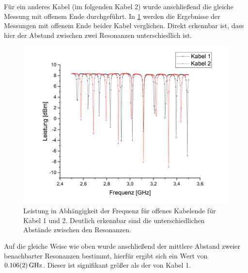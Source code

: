 Für ein anderes Kabel (im folgenden Kabel 2) wurde anschließend die gleiche Messung mit offenem Ende durchgeführt. In \cref{anderes} werden die Ergebnisse der Messungen mit offenem Ende beider Kabel verglichen. Direkt erkennbar ist, dass hier der Abstand zwischen zwei Resonanzen unterschiedlich ist.

\begin{figure}[h]
	\centering
	\includegraphics[scale=0.8]{anderes_Kabel.png}
	\caption{Leistung in Abhängigkeit der Frequenz für offenes Kabelende für Kabel 1 und 2. Deutlich erkennbar sind die unterschiedlichen Abstände zwischen den Resonanzen.}
	\label{anderes}
\end{figure}

Auf die gleiche Weise wie oben wurde anschließend der mittlere Abstand zweier benachbarter Resonanzen bestimmt, hierfür ergibt sich ein Wert von $\SI{0,106\pm0,002}{GHz}$. Dieser ist signifikant größer als der von Kabel 1.